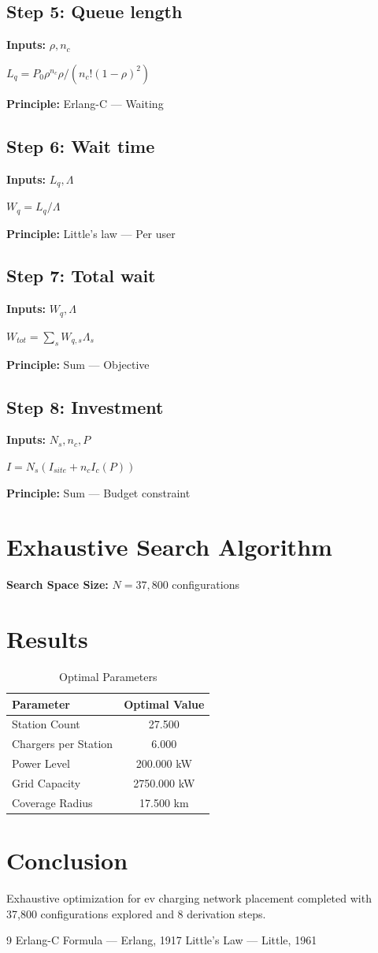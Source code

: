 \documentclass[11pt,twocolumn]{article}
\begin{document}
\subsection*{Step 5: Queue length}
\textbf{Inputs:} $\rho, n_c$

$L_q = P_0 \rho^{n_c} \rho / (n_c!(1-\rho)^2)$

\textbf{Principle:} Erlang-C --- Waiting

\subsection*{Step 6: Wait time}
\textbf{Inputs:} $L_q, \Lambda$

$W_q = L_q / \Lambda$

\textbf{Principle:} Little's law --- Per user

\subsection*{Step 7: Total wait}
\textbf{Inputs:} $W_q, \Lambda$

$W_{tot} = \sum_s W_{q,s} \Lambda_s$

\textbf{Principle:} Sum --- Objective

\subsection*{Step 8: Investment}
\textbf{Inputs:} $N_s, n_c, P$

$I = N_s(I_{site} + n_c I_c(P))$

\textbf{Principle:} Sum --- Budget constraint


\section{Exhaustive Search Algorithm}

\textbf{Search Space Size:} $N = 37,800$ configurations

\section{Results}

\begin{table}[h]
\centering
\caption{Optimal Parameters}
\begin{tabular}{@{}lc@{}}
\toprule
Parameter & Optimal Value \\
\midrule
Station Count & 27.500  \\
Chargers per Station & 6.000  \\
Power Level & 200.000 kW \\
Grid Capacity & 2750.000 kW \\
Coverage Radius & 17.500 km \\
\bottomrule
\end{tabular}
\end{table}

\section{Conclusion}
Exhaustive optimization for ev charging network placement completed with 37,800 configurations explored and 8 derivation steps.

\begin{thebibliography}{9}
 Erlang-C Formula --- Erlang, 1917
 Little's Law --- Little, 1961
\end{thebibliography}
\end{document}
